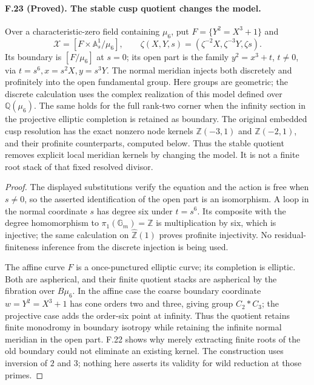 \paragraph{F.23 (Proved). The stable cusp quotient changes the model.}
Over a characteristic-zero field containing $\mu_6$, put
$F=\{Y^2=X^3+1\}$ and
\[
 \mathcal X=[F\times\mathbb A^1_s/\mu_6],\qquad
 \zeta(X,Y,s)=(\zeta^{-2}X,\zeta^{-3}Y,\zeta s).
\]
Its boundary is $[F/\mu_6]$ at $s=0$; its open part is the family
$y^2=x^3+t$, $t\ne0$, via $t=s^6,x=s^2X,y=s^3Y$.
The normal meridian injects both discretely and profinitely into
the open fundamental group. Here groups are geometric; the discrete
calculation uses the complex realization of this model defined over
$\mathbb Q(\mu_6)$. The same holds for the full rank-two corner when
the infinity section in the projective elliptic completion is retained
as boundary. The original embedded cusp resolution has the exact
nonzero node kernels $\mathbb Z(-3,1)$ and $\mathbb Z(-2,1)$,
and their profinite counterparts, computed below. Thus the stable
quotient removes explicit local meridian kernels by changing the
model. It is not a finite root stack of that fixed resolved divisor.

\begin{proof}
The displayed substitutions verify the equation and the action is
free when $s\ne0$, so the asserted identification of the open part
is an isomorphism. A loop in the normal coordinate $s$ has degree six
under $t=s^6$. Its composite with the degree homomorphism to
$\pi_1(\mathbb G_m)=\mathbb Z$ is multiplication by six, which is
injective; the same calculation on $\widehat{\mathbb Z}(1)$ proves
profinite injectivity. No residual-finiteness inference from the
discrete injection is being used.

The affine curve $F$ is a once-punctured elliptic curve; its completion
is elliptic. Both are aspherical, and their finite quotient stacks
are aspherical by the fibration over $B\mu_6$. In the affine case
the coarse boundary coordinate $w=Y^2=X^3+1$ has cone orders two
and three, giving group $C_2*C_3$; the projective case adds the
order-six point at infinity. Thus the quotient retains finite
monodromy in boundary isotropy while retaining the infinite normal
meridian in the open part. F.22 shows why merely extracting finite
roots of the old boundary could not eliminate an existing kernel.
The construction uses inversion of $2$ and $3$; nothing here asserts
its validity for wild reduction at those primes.
\end{proof}

